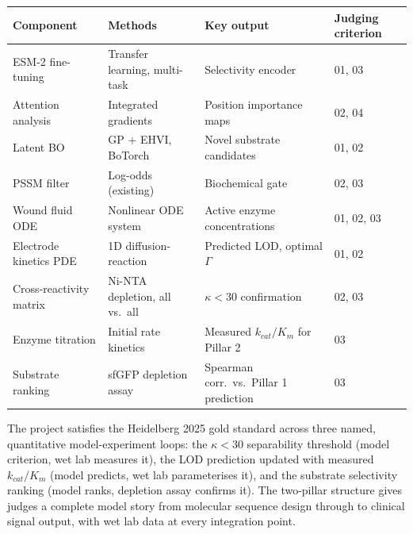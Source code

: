 \documentclass[10pt,a4paper]{article}
\begin{document}
\begin{center}
\small
\begin{tabular}{llll}
  \toprule
  Component & Methods & Key output & Judging criterion\\
  \midrule
  ESM-2 fine-tuning      & Transfer learning, multi-task & Selectivity encoder & 01, 03\\
  Attention analysis     & Integrated gradients          & Position importance maps & 02, 04\\
  Latent BO              & GP + EHVI, BoTorch            & Novel substrate candidates & 01, 02\\
  PSSM filter            & Log-odds (existing)           & Biochemical gate & 02, 03\\
  Wound fluid ODE        & Nonlinear ODE system          & Active enzyme concentrations & 01, 02, 03\\
  Electrode kinetics PDE & 1D diffusion-reaction         & Predicted LOD, optimal $\Gamma$ & 01, 02\\
  Cross-reactivity matrix  & Ni-NTA depletion, all vs.\ all  & $\kappa < 30$ confirmation & 02, 03\\
  Enzyme titration         & Initial rate kinetics           & Measured $k_{cat}/K_m$ for Pillar 2 & 03\\
  Substrate ranking        & sfGFP depletion assay           & Spearman corr.\ vs.\ Pillar 1 prediction & 03\\
  \bottomrule
\end{tabular}
\end{center}

\medskip
The project satisfies the Heidelberg 2025 gold standard across three named,
quantitative model-experiment loops: the $\kappa < 30$ separability threshold
(model criterion, wet lab measures it), the LOD prediction updated with
measured $k_{cat}/K_m$ (model predicts, wet lab parameterises it), and the
substrate selectivity ranking (model ranks, depletion assay confirms it).
The two-pillar structure gives judges a complete model story from molecular
sequence design through to clinical signal output, with wet lab data at
every integration point.
\end{document}

